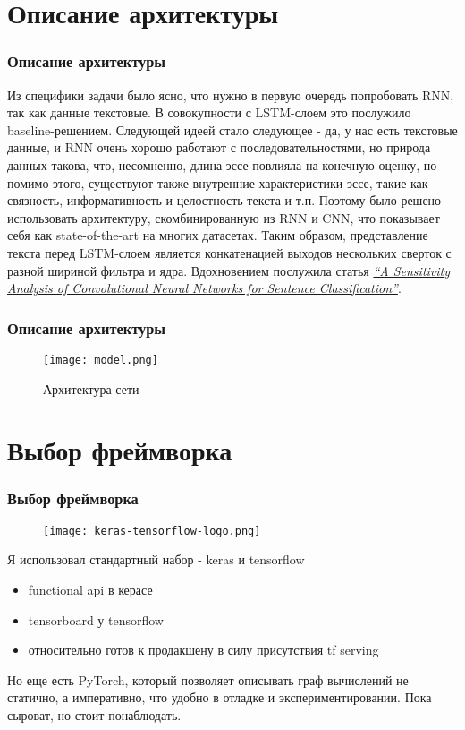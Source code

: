 \documentclass{beamer}
\begin{document}
\section{Описание архитектуры}

\begin{frame}
  \frametitle{Описание архитектуры}
Из специфики задачи было ясно, что нужно в первую очередь попробовать RNN, так
как данные текстовые. В совокупности с LSTM-слоем это послужило
baseline-решением. Следующей идеей стало следующее - да, у нас есть текстовые
данные, и RNN очень хорошо работают с последовательностями, но природа данных
такова, что, несомненно, длина эссе повлияла на конечную оценку, но помимо этого, существуют также внутренние
характеристики эссе, такие как связность, информативность и целостность текста и т.п. Поэтому было решено
использовать архитектуру, скомбинированную из RNN и CNN, что показывает себя как
state-of-the-art на многих датасетах. Таким образом, представление текста перед LSTM-слоем
является конкатенацией выходов нескольких сверток с разной шириной фильтра и ядра.
Вдохновением послужила статья
\href{https://arxiv.org/abs/1510.03820} {\textit{\color{red} ``A Sensitivity Analysis of Convolutional Neural Networks for Sentence Classification''}}.
\end{frame}

\begin{frame}
  \frametitle{Описание архитектуры}
  \begin{figure}
    \centering
    \texttt{[image: model.png]}
    \caption{Архитектура сети}
\end{figure}
\end{frame}


\section{Выбор фреймворка}
\begin{frame}
  \frametitle{Выбор фреймворка}
  \begin{figure}
    \centering
    \texttt{[image: keras-tensorflow-logo.png]}
  \end{figure}
Я использовал стандартный набор - keras и tensorflow
\begin{itemize}
\item functional api в керасе
\item tensorboard у tensorflow
\item относительно готов к продакшену в силу присутствия tf serving
\end{itemize}
Но еще есть PyTorch, который позволяет описывать граф вычислений не статично, а
императивно, что удобно в отладке и экспериментировании. Пока сыроват, но стоит
понаблюдать.
\end{frame}
\end{document}
